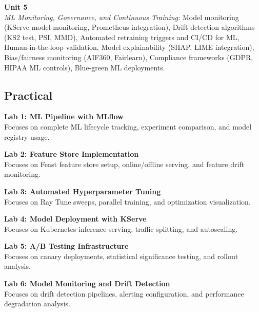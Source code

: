 \vspace{0.3cm}

\noindent\textbf{Unit 5} \\
\textit{ML Monitoring, Governance, and Continuous Training:} Model monitoring (KServe model monitoring, Prometheus integration), Drift detection algorithms (KS2 test, PSI, MMD), Automated retraining triggers and CI/CD for ML, Human-in-the-loop validation, Model explainability (SHAP, LIME integration), Bias/fairness monitoring (AIF360, Fairlearn), Compliance frameworks (GDPR, HIPAA ML controls), Blue-green ML deployments.

\newpage

\subsection*{Practical}
\noindent\textbf{Lab 1: ML Pipeline with MLflow} \\
Focuses on complete ML lifecycle tracking, experiment comparison, and model registry usage.

\vspace{0.2cm}

\noindent\textbf{Lab 2: Feature Store Implementation} \\
Focuses on Feast feature store setup, online/offline serving, and feature drift monitoring.

\vspace{0.2cm}

\noindent\textbf{Lab 3: Automated Hyperparameter Tuning} \\
Focuses on Ray Tune sweeps, parallel training, and optimization visualization.

\vspace{0.2cm}

\noindent\textbf{Lab 4: Model Deployment with KServe} \\
Focuses on Kubernetes inference serving, traffic splitting, and autoscaling.

\vspace{0.2cm}

\noindent\textbf{Lab 5: A/B Testing Infrastructure} \\
Focuses on canary deployments, statistical significance testing, and rollout analysis.

\vspace{0.2cm}

\noindent\textbf{Lab 6: Model Monitoring and Drift Detection} \\
Focuses on drift detection pipelines, alerting configuration, and performance degradation analysis.


